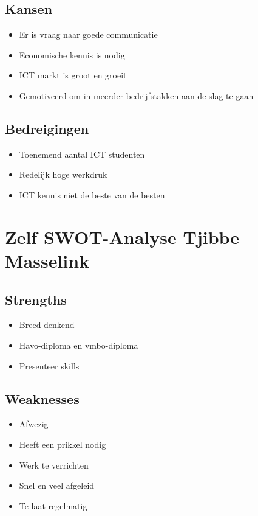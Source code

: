 \documentclass[11pt,oneside,a4paper,numbers=enddot]{report} %
\begin{document}
\subsection{Kansen}
\begin{itemize}
\item Er is vraag naar goede communicatie
\item Economische kennis is nodig
\item ICT markt is groot en groeit
\item Gemotiveerd om in meerder bedrijfstakken aan de slag te gaan
\end{itemize}

\subsection{Bedreigingen}
\begin{itemize}
\item Toenemend aantal ICT studenten
\item Redelijk hoge werkdruk
\item ICT kennis niet de beste van de besten
\end{itemize}

\section{Zelf SWOT-Analyse Tjibbe Masselink}
\subsection{Strengths}
\begin{itemize}
\item
  Breed denkend
\item
  Havo-diploma en vmbo-diploma
\item
  Presenteer skills
\end{itemize}

\subsection{Weaknesses}
\begin{itemize}
\item
  Afwezig
\item
  Heeft een prikkel nodig
\item
  Werk te verrichten
\item
  Snel en veel afgeleid
\item
  Te laat regelmatig
\end{itemize}
\end{document}
